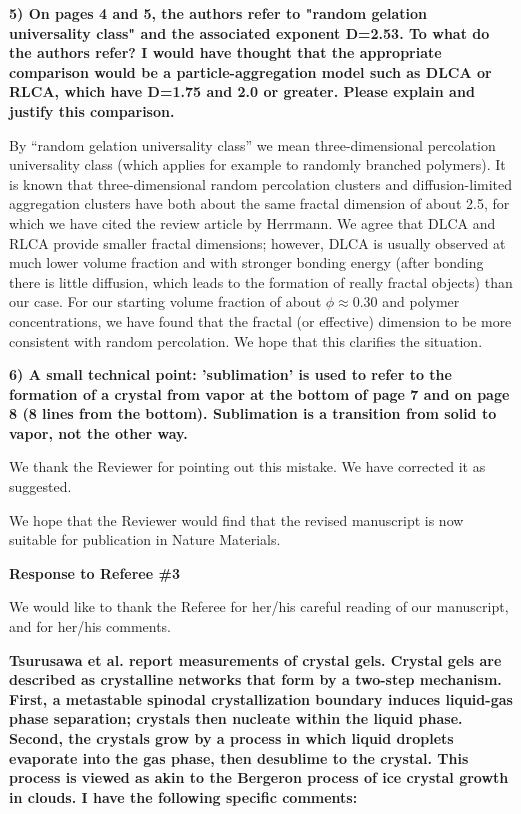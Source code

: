 \documentclass[11pt,a4paper]{article}
\newenvironment{referee}%
{\bigskip\singlespacing\bf}%
{\par\bigskip}
\begin{document}
\begin{referee}
5) On pages 4 and 5, the authors refer to "random gelation universality class" and the associated exponent D=2.53. To what do the authors refer? I would have thought that the appropriate comparison would be a particle-aggregation model such as DLCA or RLCA, which have D=1.75 and 2.0 or greater. Please explain and justify this comparison.
\end{referee}

By ``random gelation universality class'' we mean three-dimensional percolation universality class (which applies for example to randomly branched polymers).
It is known that three-dimensional random percolation clusters and diffusion-limited aggregation clusters have both about the same fractal dimension of about 2.5, for which we have cited the review article by Herrmann. We agree that DLCA and RLCA provide smaller fractal dimensions; however, DLCA is usually observed at much lower volume fraction and with stronger bonding energy (after bonding there is little diffusion, which leads to the formation of really fractal objects) than our case. For our starting volume fraction of about $\phi\approx 0.30$ and polymer concentrations, we have found that the fractal (or effective) dimension
to be more consistent with random percolation. We hope that this clarifies the situation.


\begin{referee}
6) A small technical point: 'sublimation' is used to refer to the formation of a crystal from vapor at the bottom of page 7 and on page 8 (8 lines from the bottom). Sublimation is a transition from solid to vapor, not the other way.
\end{referee}

We thank the Reviewer for pointing out this mistake. We have corrected it as suggested. 

\vspace{1cm}

We hope that the Reviewer would find that the revised manuscript is now suitable for publication in Nature Materials. 


\clearpage

\noindent
\begin{Large}
{\bf Response to Referee \#3}
\end{Large}


We would like to thank the Referee for her/his careful reading of our
manuscript, and for her/his comments.

\begin{referee}
Tsurusawa et al. report measurements of crystal gels. Crystal gels are described as crystalline networks that form by a two-step mechanism. First, a metastable spinodal crystallization boundary induces liquid-gas phase separation; crystals then nucleate within the liquid phase. Second, the crystals grow by a process in which liquid droplets evaporate into the gas phase, then desublime to the crystal. This process is viewed as akin to the Bergeron process of ice crystal growth in clouds. I have the following specific comments:
\end{referee}
\end{document}
